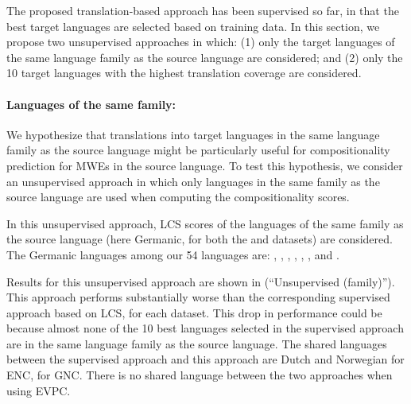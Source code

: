 \documentclass[output=paper,modfonts,nonflat]{langsci/langscibook}
\begin{document}
The proposed translation-based  approach has been
supervised so far, in that the best target languages are selected
based on training data. In this section, we propose two unsupervised
approaches in which: (1) only the target languages of the same language
family as the source language are considered; and (2) only the 10
target languages with the highest translation coverage are considered.

\paragraph*{Languages of the same family:}


We hypothesize that translations into target languages in the same
language family as the source language might be particularly useful
for compositionality prediction for MWEs in the source language. To
test this hypothesis, we consider an unsupervised approach in which
only languages in the same family as the source language are used when
computing the compositionality scores.

In this unsupervised approach, LCS scores of the languages of the same
family as the source language (here Germanic, for both the  and
 datasets) are considered. The Germanic languages among our 54
languages are: , , , , ,
,  and .

Results for this unsupervised approach are shown in
 (``Unsupervised (family)''). This
approach performs substantially worse than the corresponding
supervised approach based on LCS, for each dataset. This drop in
performance could be because almost none of the 10 best languages
selected in the supervised approach are in the same language family as
the source language. The shared languages between the supervised approach
and this approach are Dutch and Norwegian for ENC,  for GNC. 
There is no shared language between the two approaches when using EVPC.

\end{document}
